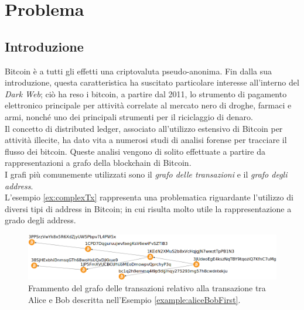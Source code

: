\chapter{Problema}\label{chap:problema}

\section{Introduzione} \label{sec:problemaIntroduzione}

Bitcoin è a tutti gli effetti una criptovaluta pseudo-anonima. Fin dalla sua introduzione, questa  caratteristica  ha suscitato particolare interesse all’interno del \emph{Dark Web}; ciò ha reso i bitcoin, a partire dal 2011,  lo strumento di pagamento elettronico principale per attività correlate al mercato nero di droghe, farmaci e armi, nonché uno dei principali strumenti per il riciclaggio di denaro.\\
Il concetto di distributed ledger, associato all’utilizzo estensivo di Bitcoin per attività illecite, ha dato vita a numerosi studi di analisi forense per tracciare il flusso dei bitcoin. Queste analisi vengono di solito effettuate a partire da rappresentazioni a grafo della blockchain di Bitcoin.\\
I grafi più comunemente utilizzati sono il \emph{grafo delle transazioni} e il \emph{grafo degli address}.\\
L'esempio \ref{ex:complexTx} rappresenta una problematica riguardante l'utilizzo di diversi tipi di address in Bitcoin; in cui risulta molto utile la rappresentazione a grado degli address.
\begin{figure}
\centering
\includegraphics[scale=0.35]{images/exampleWithGraph/complex-tx.png}
\caption{Frammento del grafo delle transazioni relativo alla  transazione tra Alice e Bob descritta nell’Esempio \ref{example:aliceBobFirst}.\label{fig:complexTx}}
\end{figure}

